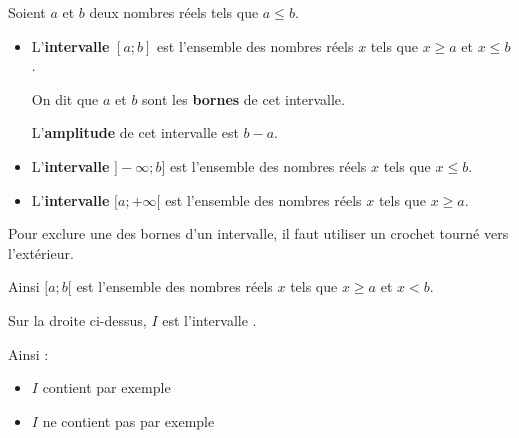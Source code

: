 \documentclass[noheader]{coursclass}
\begin{document}
\begin{definition}[Intervalle de $ℝ$]
	Soient $a$ et $b$ deux nombres réels tels que $a ≤ b$.
	\begin{itemize}
		\item L'\textbf{intervalle} $[a ; b]$ est l'ensemble des nombres réels $x$ tels que $x ≥ a$ et $x ≤ b$.

		      On dit que $a$ et $b$ sont les \textbf{bornes} de cet intervalle.

		      L'\textbf{amplitude} de cet intervalle est $b - a$.
		\item L'\textbf{intervalle} $]-∞ ; b]$ est l'ensemble des nombres réels $x$ tels que $x ≤ b$.
		\item L'\textbf{intervalle} $[a ; +∞[$ est l'ensemble des nombres réels $x$ tels que $x ≥ a$.
	\end{itemize}

	Pour exclure une des bornes d'un intervalle, il faut utiliser un crochet tourné vers l'extérieur.

	Ainsi $[a ; b[$ est l'ensemble des nombres réels $x$ tels que $x ≥ a$ et $x < b$.
\end{definition}

\begin{exemple}
	\begin{center}
	\end{center}

	Sur la droite ci-dessus, $I$ est l'intervalle \correctionDots{$[1, 3[$}.

	Ainsi :
	\begin{itemize}
		\item $I$ contient par exemple 
		\item $I$ ne contient pas par exemple 
	\end{itemize}
\end{exemple}
\end{document}
